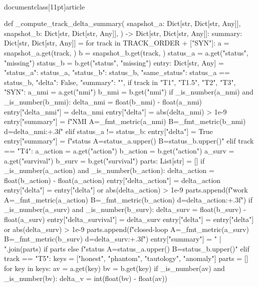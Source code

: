 \\documentclass[11pt]{article}
\begin{document}
\begin{CodeBlock}
{def _compute_track_delta_summary(
    snapshot_a: Dict[str, Dict[str, Any]],
    snapshot_b: Dict[str, Dict[str, Any]],
) -> Dict[str, Dict[str, Any]]:
    summary: Dict[str, Dict[str, Any]] = {}
    for track in TRACK_ORDER + ["SYN"]:
        a = snapshot_a.get(track, {})
        b = snapshot_b.get(track, {})
        status_a = a.get("status", "missing")
        status_b = b.get("status", "missing")
        entry: Dict[str, Any] = {
            "status_a": status_a,
            "status_b": status_b,
            "same_status": status_a == status_b,
            "delta": False,
            "summary": "",
        }
        if track in {"T1", "T1.5", "T2", "T3", "SYN"}:
            a_nmi = a.get("nmi")
            b_nmi = b.get("nmi")
            if _is_number(a_nmi) and _is_number(b_nmi):
                delta_nmi = float(b_nmi) - float(a_nmi)
                entry["delta_nmi"] = delta_nmi
                entry["delta"] = abs(delta_nmi) > 1e-9
                entry["summary"] = f"NMI A={_fmt_metric(a_nmi)} B={_fmt_metric(b_nmi)} d={delta_nmi:+.3f}"
            elif status_a != status_b:
                entry["delta"] = True
                entry["summary"] = f"status A={status_a.upper()} B={status_b.upper()}"
        elif track == "T4":
            a_action = a.get("action")
            b_action = b.get("action")
            a_surv = a.get("survival")
            b_surv = b.get("survival")
            parts: List[str] = []
            if _is_number(a_action) and _is_number(b_action):
                delta_action = float(b_action) - float(a_action)
                entry["delta_action"] = delta_action
                entry["delta"] = entry["delta"] or abs(delta_action) > 1e-9
                parts.append(f"work A={_fmt_metric(a_action)} B={_fmt_metric(b_action)} d={delta_action:+.3f}")
            if _is_number(a_surv) and _is_number(b_surv):
                delta_surv = float(b_surv) - float(a_surv)
                entry["delta_survival"] = delta_surv
                entry["delta"] = entry["delta"] or abs(delta_surv) > 1e-9
                parts.append(f"closed-loop A={_fmt_metric(a_surv)} B={_fmt_metric(b_surv)} d={delta_surv:+.3f}")
            entry["summary"] = " | ".join(parts) if parts else f"status A={status_a.upper()} B={status_b.upper()}"
        elif track == "T5":
            keys = ["honest", "phantom", "tautology", "anomaly"]
            parts = []
            for key in keys:
                av = a.get(key)
                bv = b.get(key)
                if _is_number(av) and _is_number(bv):
                    delta_v = int(float(bv) - float(av))
}
\end{CodeBlock}
\end{document}
